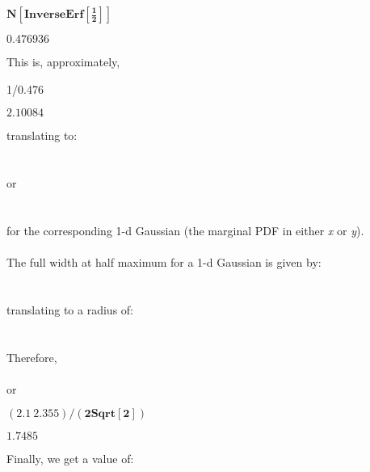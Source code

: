 \documentclass{article}
\begin{document}
\begin{doublespace}
\noindent\(\pmb{N\left[\text{InverseErf}\left[\frac{1}{2}\right]\right]}\)
\end{doublespace}

\begin{doublespace}
\noindent\(0.476936\)
\end{doublespace}

This is, approximately,

1/0.476

\begin{doublespace}
\noindent\(2.10084\)
\end{doublespace}

translating to:\\
\\
\(\)\\
\\
or\\
\\
\(\)\\
\\
for the corresponding 1-d Gaussian (the marginal PDF in either \textit{ x }or \textit{ y}).\\
\\
The full width at half maximum for a 1-d Gaussian is given by:\\
\\
\(\)\\
\\
translating to a radius of:\\
\\
\(\)\\
\\
Therefore,\\
\\
\(\)\\
or\\
\(\)

\begin{doublespace}
\noindent\(\pmb{(2.1\ 2.355)/(2\text{Sqrt}[2])}\)
\end{doublespace}

\begin{doublespace}
\noindent\(1.7485\)
\end{doublespace}

Finally, we get a value of:\\
\(\) 
\end{document}
